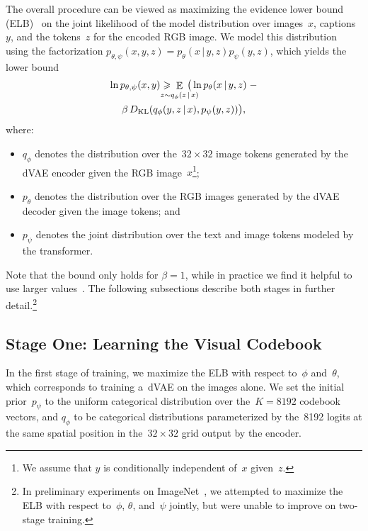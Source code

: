 \documentclass{article}
\newcommand{\given}{\,|\,}{}
\begin{document}
The overall procedure can be viewed as maximizing the evidence lower bound (ELB)~\cite{kingma2013auto,rezende2014stochastic} on the joint likelihood of the model distribution over images~$x$, captions~$y$, and the tokens~$z$ for the encoded RGB image. We model this distribution using the factorization $p_{\theta, \psi}(x, y, z) = p_\theta(x \given y, z) p_\psi(y, z)$, which yields the lower bound
\begin{multline}
    \ln p_{\theta, \psi}(x, y) \geqslant \!\!\!\!\!\!\!\! \mathop{\mathbb{E}}_{\substack{\vspace{0.1mm} \\ z \sim q_\phi(z \given x)}} \!\!\!\!\!\!\!\! \big( \ln p_\theta(x \given y, z)
    \;- \\ 
    \beta\, D_{\mathrm{KL}}(q_\phi(y, z \given x), p_\psi(y,z)) \big), \label{eq:elb}
\end{multline}
where:
\begin{itemize}
    \item $q_\phi$ denotes the distribution over the~$32 \times 32$ image tokens generated by the dVAE encoder given the RGB image~$x$\footnote{We assume that $y$ is conditionally independent of~$x$ given~$z$.};
    \item $p_\theta$ denotes the distribution over the RGB images generated by the dVAE decoder given the image tokens; and
    \item $p_\psi$ denotes the joint distribution over the text and image tokens modeled by the transformer.
\end{itemize}
Note that the bound only holds for $\beta=1$, while in practice we find it helpful to use larger values~\cite{higgins2016beta}. The following subsections describe both stages in further detail.\footnote{In preliminary experiments on ImageNet~\cite{deng2009imagenet}, we attempted to maximize the ELB with respect to~$\phi$, $\theta$, and~$\psi$ jointly, but were unable to improve on two-stage training.}

\subsection{Stage One: Learning the Visual Codebook}

In the first stage of training, we maximize the ELB with respect to~$\phi$ and~$\theta$, which corresponds to training a~dVAE on the images alone. We set the initial prior~$p_\psi$ to the uniform categorical distribution over the~$K = \num{8192}$ codebook vectors, and $q_\phi$ to be categorical distributions parameterized by the~\num{8192} logits at the same spatial position in the~$32 \times 32$ grid output by the encoder.
\end{document}
